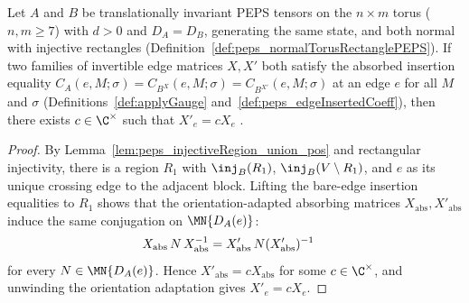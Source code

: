 \begin{lemma}%
    \label{thm:torusAbsorbedGauge_unique_scalar}
    \leanok
    Let $A$ and $B$ be translationally invariant PEPS tensors on the $n\times m$
    torus ($n,m\ge 7$) with $d>0$ and $D_A=D_B$, generating the same state, and
    both normal with injective rectangles
    (Definition~\ref{def:peps_normalTorusRectanglePEPS}). If two families of
    invertible edge matrices $X,X'$ both satisfy the absorbed insertion
    equality $C_A(e,M;\sigma)=C_{B^X}(e,M;\sigma)=C_{B^{X'}}(e,M;\sigma)$ at an
    edge $e$ for all $M$ and $\sigma$
    (Definitions~\ref{def:applyGauge} and~\ref{def:peps_edgeInsertedCoeff}),
    then there exists $c\in\C^\times$ such that $X'_e=c X_e$
    \cite[Theorem~3]{Molnar2018NormalPEPS}.
    \begin{proof}
        \leanok
        By Lemma~\ref{lem:peps_injectiveRegion_union_pos} and rectangular
        injectivity, there is a region $R_1$ with $\inj_B(R_1)$,
        $\inj_B(V\setminus R_1)$, and $e$ as its unique crossing edge to the
        adjacent block. Lifting the bare-edge insertion equalities to $R_1$
        shows that the orientation-adapted absorbing matrices
        $X_{\mathrm{abs}},X'_{\mathrm{abs}}$ induce the same conjugation on
        $\MN{D_A(e)}$:
        \begin{align}
            X_{\mathrm{abs}}\,N\,X_{\mathrm{abs}}^{-1}
             & =
            X'_{\mathrm{abs}}\,N
            (X'_{\mathrm{abs}})^{-1}
            \notag
        \end{align}
        for every $N\in\MN{D_A(e)}$. Hence
        $X'_{\mathrm{abs}}=c X_{\mathrm{abs}}$ for some $c\in\C^\times$, and
        unwinding the orientation adaptation gives $X'_e=c X_e$.
    \end{proof}
\end{lemma}


